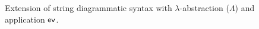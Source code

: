 \begin{figure}
    \centering
    \caption{Extension of string diagrammatic syntax with $\lambda$-abstraction ($\Lambda$) and application $\operatorname{\textsf{ev}}$.}
    \label{fig:lambda-string}
\end{figure}

